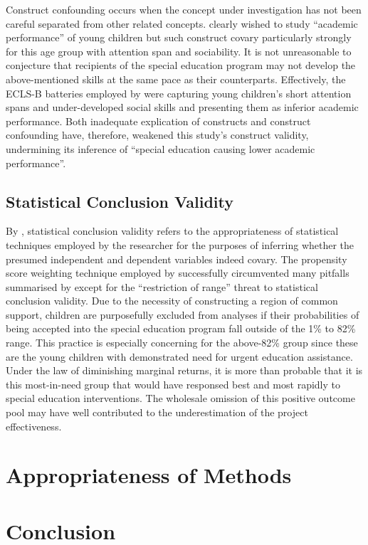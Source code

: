 Construct confounding occurs when the concept under investigation has not been careful separated from other related concepts. \textcite{sullivan:2013} clearly wished to study ``academic performance'' of young children but such construct covary particularly strongly for this age group with attention span and sociability. It is not unreasonable to conjecture that recipients of the special education program may not develop the above-mentioned skills at the same pace as their counterparts. Effectively, the ECLS-B batteries employed by \textcite{sullivan:2013} were capturing young children's short attention spans and under-developed social skills and presenting them as inferior academic performance. Both inadequate explication of constructs and construct confounding have, therefore, weakened this study's construct validity, undermining its inference of ``special education causing lower academic performance''.

\subsection{Statistical Conclusion Validity}

By \textcite{cook:1979}, statistical conclusion validity refers to the appropriateness of statistical techniques employed by the researcher for the purposes of inferring whether the presumed independent and dependent variables indeed covary. The propensity score weighting technique employed by \textcite{sullivan:2013} successfully circumvented many pitfalls summarised by \textcite[][pp. 45--52]{shadish:2002} except for the ``restriction of range'' threat to statistical conclusion validity. Due to the necessity of constructing a region of common support, children are purposefully excluded from analyses if their probabilities of being accepted into the special education program fall outside of the 1\% to 82\% range. This practice is especially concerning for the above-82\% group since these are the young children with demonstrated need for urgent education assistance. Under the law of diminishing marginal returns, it is more than probable that it is this most-in-need group that would have responsed best and most rapidly to special education interventions. The wholesale omission of this positive outcome pool may have well contributed to the underestimation of the project effectiveness.

\section{Appropriateness of Methods}



\section{Conclusion}
